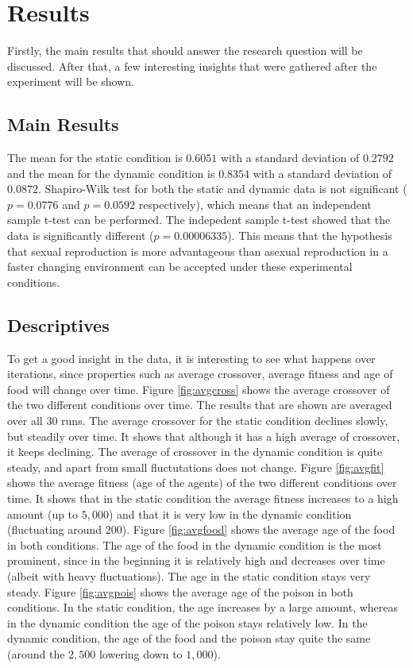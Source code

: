 \section{Results}

Firstly, the main results that should answer the research question will be discussed.
After that, a few interesting insights that were gathered after the experiment will be shown.

\subsection{Main Results}
The mean for the static condition is $0.6051$ with a standard deviation of $0.2792$ and the mean for the dynamic condition is $0.8354$ with a standard deviation of $0.0872$.
Shapiro-Wilk test for both the static and dynamic data is not significant ($p = 0.0776$ and $p = 0.0592$ respectively), which means that an independent sample t-test can be performed. %
The indepedent sample t-test showed that the data is significantly different ($p = 0.00006335$).
This means that the hypothesis that sexual reproduction is more advantageous than asexual reproduction in a faster changing environment can be accepted under these experimental conditions.

\subsection{Descriptives}
To get a good insight in the data, it is interesting to see what happens over iterations, since properties such as average crossover, average fitness and age of food will change over time.
Figure \ref{fig:avgcross} shows the average crossover of the two different conditions over time.
The results that are shown are averaged over all $30$ runs.
The average crossover for the static condition declines slowly, but steadily over time.
It shows that although it has a high average of crossover, it keeps declining.
The average of crossover in the dynamic condition is quite steady, and apart from small fluctutations does not change.
Figure \ref{fig:avgfit} shows the average fitness (age of the agents) of the two different conditions over time.
It shows that in the static condition the average fitness increases to a high amount (up to $5,000$) and that it is very low in the dynamic condition (fluctuating around $200$).
Figure \ref{fig:avgfood} shows the average age of the food in both conditions.
The age of the food in the dynamic condition is the most prominent, since in the beginning it is relatively high and decreases over time (albeit with heavy fluctuations).
The age in the static condition stays very steady.
Figure \ref{fig:avgpois} shows the average age of the poison in both conditions.
In the static condition, the age increases by a large amount, whereas in the dynamic condition the age of the poison stays relatively low.
In the dynamic condition, the age of the food and the poison stay quite the same (around the $2,500$ lowering down to $1,000$).

